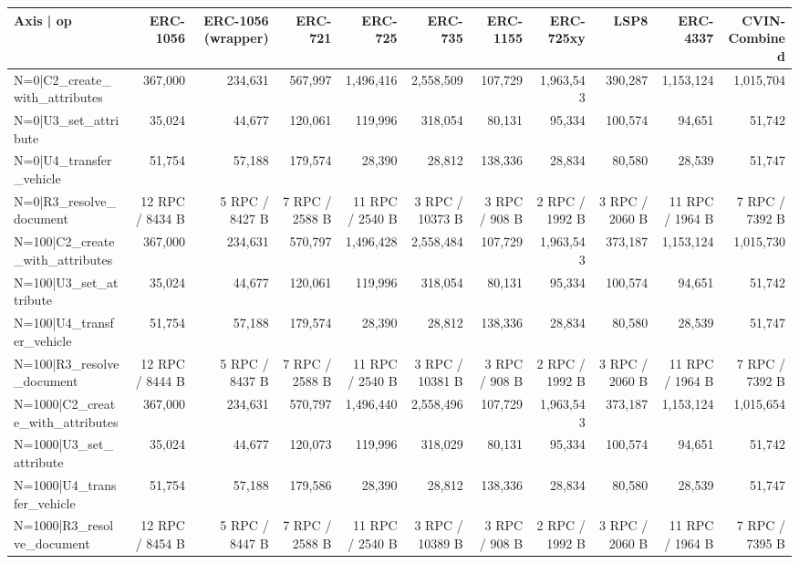 \begin{table}[ht]
\centering
\small
\begin{tabular}{lrrrrrrrrrr}
\toprule
Axis | op & ERC-1056 & ERC-1056 (wrapper) & ERC-721 & ERC-725 & ERC-735 & ERC-1155 & ERC-725xy & LSP8 & ERC-4337 & CVIN-Combined \\
\midrule
N=0|C2\_create\_with\_attributes & 367,000 & 234,631 & 567,997 & 1,496,416 & 2,558,509 & 107,729 & 1,963,543 & 390,287 & 1,153,124 & 1,015,704 \\
N=0|U3\_set\_attribute & 35,024 & 44,677 & 120,061 & 119,996 & 318,054 & 80,131 & 95,334 & 100,574 & 94,651 & 51,742 \\
N=0|U4\_transfer\_vehicle & 51,754 & 57,188 & 179,574 & 28,390 & 28,812 & 138,336 & 28,834 & 80,580 & 28,539 & 51,747 \\
N=0|R3\_resolve\_document & 12 RPC / 8434 B & 5 RPC / 8427 B & 7 RPC / 2588 B & 11 RPC / 2540 B & 3 RPC / 10373 B & 3 RPC / 908 B & 2 RPC / 1992 B & 3 RPC / 2060 B & 11 RPC / 1964 B & 7 RPC / 7392 B \\
N=100|C2\_create\_with\_attributes & 367,000 & 234,631 & 570,797 & 1,496,428 & 2,558,484 & 107,729 & 1,963,543 & 373,187 & 1,153,124 & 1,015,730 \\
N=100|U3\_set\_attribute & 35,024 & 44,677 & 120,061 & 119,996 & 318,054 & 80,131 & 95,334 & 100,574 & 94,651 & 51,742 \\
N=100|U4\_transfer\_vehicle & 51,754 & 57,188 & 179,574 & 28,390 & 28,812 & 138,336 & 28,834 & 80,580 & 28,539 & 51,747 \\
N=100|R3\_resolve\_document & 12 RPC / 8444 B & 5 RPC / 8437 B & 7 RPC / 2588 B & 11 RPC / 2540 B & 3 RPC / 10381 B & 3 RPC / 908 B & 2 RPC / 1992 B & 3 RPC / 2060 B & 11 RPC / 1964 B & 7 RPC / 7392 B \\
N=1000|C2\_create\_with\_attributes & 367,000 & 234,631 & 570,797 & 1,496,440 & 2,558,496 & 107,729 & 1,963,543 & 373,187 & 1,153,124 & 1,015,654 \\
N=1000|U3\_set\_attribute & 35,024 & 44,677 & 120,073 & 119,996 & 318,029 & 80,131 & 95,334 & 100,574 & 94,651 & 51,742 \\
N=1000|U4\_transfer\_vehicle & 51,754 & 57,188 & 179,586 & 28,390 & 28,812 & 138,336 & 28,834 & 80,580 & 28,539 & 51,747 \\
N=1000|R3\_resolve\_document & 12 RPC / 8454 B & 5 RPC / 8447 B & 7 RPC / 2588 B & 11 RPC / 2540 B & 3 RPC / 10389 B & 3 RPC / 908 B & 2 RPC / 1992 B & 3 RPC / 2060 B & 11 RPC / 1964 B & 7 RPC / 7395 B \\

\end{tabular}
\end{table}
